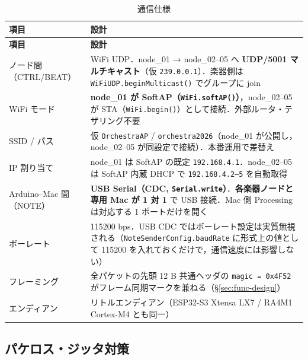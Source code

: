 \documentclass[lualatex,book,paper=a4paper,jafontsize=11.5pt,jafontscale=1.05]{jlreq}
\begin{document}
\begin{longtable}{p{} p{}}
\caption{通信仕様}\label{tab:net-spec}\\
\toprule
\textbf{項目} & \textbf{設計} \\
\midrule
\endfirsthead
\toprule
\textbf{項目} & \textbf{設計} \\
\midrule
\endhead
ノード間（CTRL/BEAT）    & WiFi UDP．node\_01 → node\_02--05 へ \textbf{UDP/5001 マルチキャスト}（仮 \texttt{239.0.0.1}）．楽器側は \texttt{WiFiUDP.beginMulticast()} でグループに join \\
WiFi モード              & \textbf{node\_01 が SoftAP（\texttt{WiFi.softAP()}）}，node\_02--05 が STA（\texttt{WiFi.begin()}）として接続．外部ルータ・テザリング不要 \\
SSID / パス             & 仮 \texttt{OrchestraAP} / \texttt{orchestra2026}（node\_01 が公開し，node\_02--05 が同設定で接続）．本番運用で差替え \\
IP 割り当て              & node\_01 は SoftAP の既定 \texttt{192.168.4.1}．node\_02--05 は SoftAP 内蔵 DHCP で \texttt{192.168.4.2--5} を自動取得 \\
Arduino--Mac 間（NOTE）  & \textbf{USB Serial（CDC, \texttt{Serial.write}）}．\textbf{各楽器ノードと専用 Mac が 1 対 1} で USB 接続．Mac 側 Processing は対応する 1 ポートだけを開く \\
ボーレート               & 115200 bps．USB CDC ではボーレート設定は実質無視される（\texttt{NoteSenderConfig.baudRate} に形式上の値として 115200 を入れておくだけで，通信速度には影響しない） \\
フレーミング             & 全パケットの先頭 12 B 共通ヘッダの \texttt{magic = 0x4F52} がフレーム同期マークを兼ねる（\S\ref{sec:func-design}） \\
エンディアン             & リトルエンディアン（ESP32-S3 Xtensa LX7 / RA4M1 Cortex-M4 とも同一） \\
\bottomrule
\end{longtable}

\subsection{パケロス・ジッタ対策}
\end{document}

